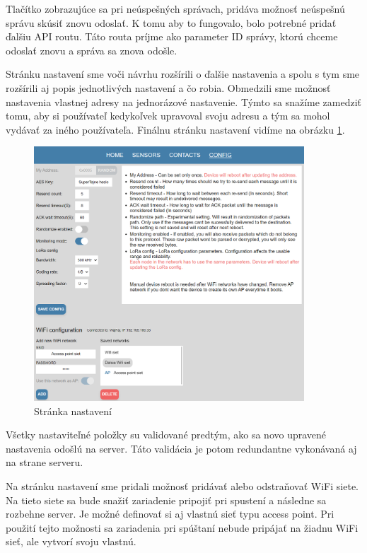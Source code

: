 \documentclass[slovak,master]{diploma}
\begin{document}
Tlačítko zobrazujúce sa pri neúspešných správach, pridáva možnosť neúspešnú správu skúsiť znovu odoslať. K tomu aby to fungovalo, 
bolo potrebné pridať ďalšiu API routu. Táto routa príjme ako parameter ID správy, ktorú chceme odoslať znovu a správa sa znova odošle.

Stránku nastavení sme voči návrhu rozšírili o ďalšie nastavenia a spolu s tym sme rozšírili aj popis jednotlivých nastavení a čo robia.
Obmedzili sme možnosť nastavenia vlastnej adresy na jednorázové nastavenie. Týmto sa snažíme zamedziť tomu, aby si používateľ kedykoľvek 
upravoval svoju adresu a tým sa mohol vydávať za iného používateľa. Finálnu stránku nastavení vidíme na obrázku \ref{fig:webConfig}.

\begin{figure}[h!]
  \centering
  \includegraphics[width=0.9\textwidth]{Figures/webConfig.png}
  \caption{Stránka nastavení}
  \label{fig:webConfig}
\end{figure}

Všetky nastaviteľné položky su validované predtým, ako sa novo upravené nastavenia odošlú na server. Táto validácia je potom redundantne 
vykonávaná aj na strane serveru.

Na stránku nastavení sme pridali možnosť pridávať alebo odstraňovať WiFi siete. Na tieto siete sa bude snažiť zariadenie pripojiť pri spustení a 
následne sa rozbehne server. Je možné definovať si aj vlastnú sieť typu access point. Pri použití tejto možnosti sa zariadenia pri spúštaní 
nebude pripájať na žiadnu WiFi sieť, ale vytvorí svoju vlastnú.
\end{document}
